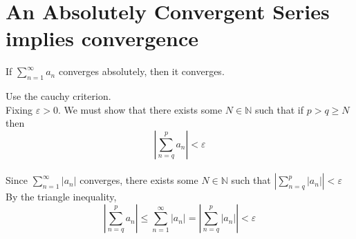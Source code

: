 \documentclass[12pt]{article}
\begin{document}
\section{An Absolutely Convergent Series implies convergence}
\begin{theo}{}
If \(\displaystyle\sum_{n=1}^\infty a_n\) converges absolutely, then it converges.   
\end{theo}
\begin{prf}{}
Use the cauchy criterion.\\
Fixing \(\varepsilon > 0\). We must show that there exists some \(N \in \mathbb N\) such that if \(p > q \ge N\) then \[\left|\displaystyle\sum_{n = q}^p a_n\right| < \varepsilon\]\\
Since \(\displaystyle\sum_{n=1}^\infty |a_n|\) converges, there exists some \(N \in \mathbb N\) such that \(\left|\displaystyle\sum_{n = q}^p |a_n|\right| < \varepsilon\)\\
By the triangle inequality, \[\left|\displaystyle\sum_{n = q}^p a_n\right| \le \displaystyle\sum_{n=1}^\infty |a_n| = \left|\displaystyle\sum_{n = q}^p |a_n|\right| < \varepsilon \]
\end{prf}

\newpage
\end{document}
